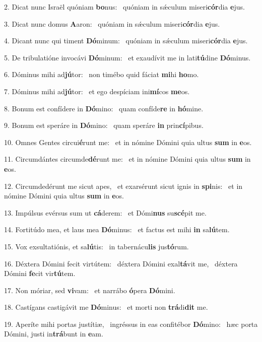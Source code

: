 2. Dicat nunc Israël quóniam \textbf{bo}nus: \ast\  quóniam in sǽculum miseri\textbf{cór}dia \textbf{e}jus.\

3. Dicat nunc domus \textbf{A}aron: \ast\  quóniam in sǽculum miseri\textbf{cór}dia \textbf{e}jus.\

4. Dicant nunc qui timent \textbf{Dó}minum: \ast\  quóniam in sǽculum miseri\textbf{cór}dia \textbf{e}jus.\

5. De tribulatióne invocávi \textbf{Dó}minum: \ast\  et exaudívit me in lati\textbf{tú}dine \textbf{Dó}minus.\

6. Dóminus mihi ad\textbf{jú}tor: \ast\  non timébo quid fáciat \textbf{mi}hi \textbf{ho}mo.\

7. Dóminus mihi ad\textbf{jú}tor: \ast\  et ego despíciam ini\textbf{mí}cos \textbf{me}os.\

8. Bonum est confídere in \textbf{Dó}mino: \ast\  quam confíde\textbf{re} in \textbf{hó}mine.\

9. Bonum est speráre in \textbf{Dó}mino: \ast\  quam speráre \textbf{in} prin\textbf{cí}pibus.\

10. Omnes Gentes circui\textbf{é}runt me: \ast\  et in nómine Dómini quia ultus \textbf{sum} in \textbf{e}os.\

11. Circumdántes circumde\textbf{dé}runt me: \ast\  et in nómine Dómini quia ultus \textbf{sum} in \textbf{e}os.\

12. Circumdedérunt me sicut apes, \dag\  et exarsérunt sicut ignis in \textbf{spi}nis: \ast\  et in nómine Dómini quia ultus \textbf{sum} in \textbf{e}os.\

13. Impúlsus evérsus sum ut \textbf{cá}derem: \ast\  et Dómi\textbf{nus} su\textbf{scé}pit me.\

14. Fortitúdo mea, et laus mea \textbf{Dó}minus: \ast\  et factus est mihi \textbf{in} sa\textbf{lú}tem.\

15. Vox exsultatiónis, et sa\textbf{lú}tis: \ast\  in tabernácu\textbf{lis} jus\textbf{tó}rum.\

16. Déxtera Dómini fecit virtútem: \dag\  déxtera Dómini exal\textbf{tá}vit me, \ast\  déxtera Dómini \textbf{fe}cit vir\textbf{tú}tem.\

17. Non móriar, sed \textbf{vi}vam: \ast\  et narrábo \textbf{ó}pera \textbf{Dó}mini.\

18. Castígans castigávit me \textbf{Dó}minus: \ast\  et morti non \textbf{trá}di\textbf{dit} me.\

19. Aperíte mihi portas justítiæ, \dag\  ingréssus in eas confitébor \textbf{Dó}mino: \ast\  hæc porta Dómini, justi in\textbf{trá}bunt in \textbf{e}am.\

